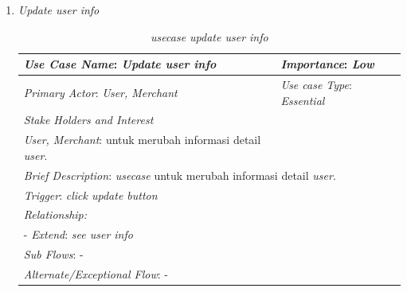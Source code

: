 \documentclass[a4paper]{article}
\begin{document}
\begin{enumerate}
\begin{enumerate}
        \item \textit{Update user info}
        \begin{table}[h]
            \centering
            \caption{\textit{usecase update user info} }
            \begin{tabular}{|lll}
            \hline
            \multicolumn{1}{|l|}{\textit{Use Case Name}: \textit{Update user info}}             & \multicolumn{2}{l|}{\textit{Importance}: \textit{Low}}   \\ \hline
            \multicolumn{1}{|l|}{\textit{Primary Actor}: \textit{User, Merchant}}             & \multicolumn{2}{l|}{\textit{Use case Type}: \textit{Essential}} \\ \hline
            \multicolumn{1}{|l|}{\textit{Stake Holders and Interest}} &                               &                               \\ \cline{1-1}
            \multicolumn{1}{|l|}{\textit{User, Merchant}: untuk merubah informasi detail \textit{user}.}                                                     &                               &                               \\ \hline
            \multicolumn{3}{|l|}{\textit{Brief Description}: \textit{usecase} untuk merubah informasi detail \textit{user}.}                                                                         \\ \hline
            \multicolumn{3}{|l|}{\textit{Trigger}: \textit{click update button}}                                                                                   \\ \hline
            \multicolumn{3}{|l|}{\textit{Relationship:}}                                                                              \\ \hline
            \multicolumn{3}{|l|}{- \textit{Extend}: \textit{see user info}}                                                                                                                     \\ \hline
            \multicolumn{3}{|l|}{\textit{Sub Flows}: -}                                                                                 \\ \hline
            \multicolumn{3}{|l|}{\textit{Alternate/Exceptional Flow}: -}                                                                \\ \hline
            \end{tabular}
        \end{table}


\end{enumerate}
\end{enumerate}
\end{document}

